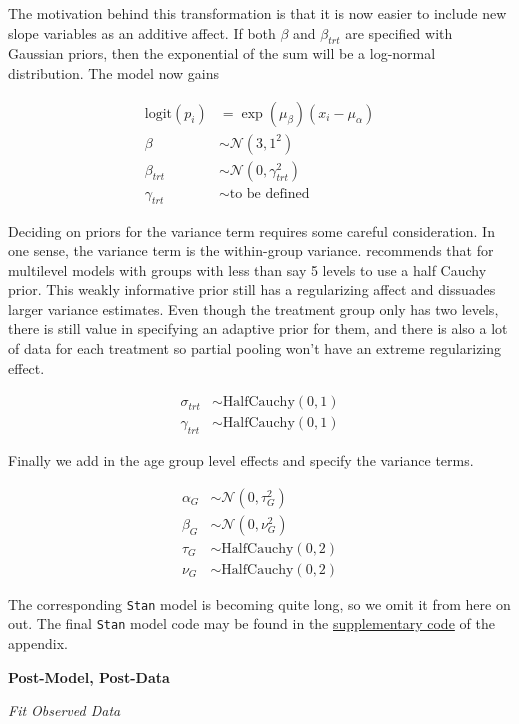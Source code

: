 \documentclass[11pt, oneside, openany]{scrbook}
\begin{document}
The motivation behind this transformation is that it is now easier to include new slope variables as an additive affect. If both \(\beta\) and \(\beta_{trt}\) are specified with Gaussian priors, then the exponential of the sum will be a log-normal distribution. The model now gains

\begin{align*}
\mathrm{logit}(p_i) &= \exp(\mu_\beta) (x_i - \mu_\alpha) \\
\beta &\sim \mathcal{N}(3, 1^2) \\
\beta_{trt} &\sim \mathcal{N}(0, \gamma_{trt}^2) \\
\gamma_{trt} &\sim \textrm{to be defined}
\end{align*}

Deciding on priors for the variance term requires some careful consideration. In one sense, the variance term is the within-group variance. \citet{gelman2006prior} recommends that for multilevel models with groups with less than say 5 levels to use a half Cauchy prior. This weakly informative prior still has a regularizing affect and dissuades larger variance estimates. Even though the treatment group only has two levels, there is still value in specifying an adaptive prior for them, and there is also a lot of data for each treatment so partial pooling won't have an extreme regularizing effect.

\begin{align*}
\sigma_{trt} &\sim \mathrm{HalfCauchy}(0, 1) \\
\gamma_{trt} &\sim \mathrm{HalfCauchy}(0, 1)
\end{align*}

Finally we add in the age group level effects and specify the variance terms.

\begin{align*}
\alpha_{G} &\sim \mathcal{N}(0, \tau_{G}^2)\\
\beta_{G} &\sim \mathcal{N}(0, \nu_{G}^2) \\
\tau_{G} &\sim \mathrm{HalfCauchy}(0, 2) \\
\nu_{G} &\sim \mathrm{HalfCauchy}(0, 2)
\end{align*}

The corresponding \texttt{Stan} model is becoming quite long, so we omit it from here on out. The final \texttt{Stan} model code may be found in the \protect\hyperlink{code}{supplementary code} of the appendix.

\textbf{Post-Model, Post-Data}

\emph{Fit Observed Data}
\end{document}
